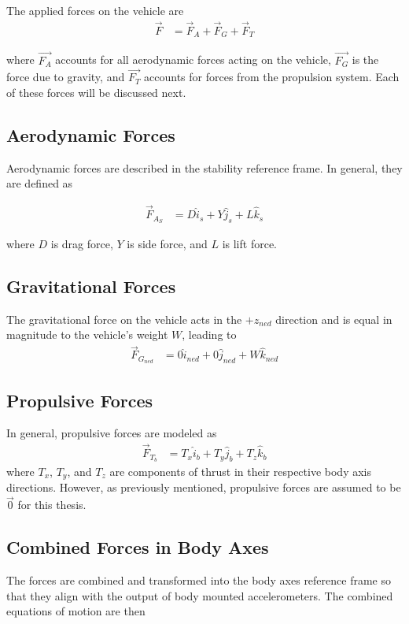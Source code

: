 \documentclass[12pt]{ucthesis}
\begin{document}
The applied forces on the vehicle are 
\begin{align}
\vec{F} &= \vec{F}_{A}+\vec{F}_{G}+\vec{F}_{T}
\end{align}

where $\vec{F_{A}}$ accounts for all aerodynamic forces acting on the vehicle, $\vec{F_{G}}$ is the force due to gravity, and $\vec{F_{T}}$ accounts for forces from the propulsion system. Each of these forces will be discussed next.

\subsection*{Aerodynamic Forces}
Aerodynamic forces are described in the stability reference frame. In general, they are defined as

\begin{align}
\vec{F}_{A_S} &= D \hat{i}_s+Y \hat{j}_s+L \hat{k}_s
\end{align}

where $D$ is drag force, $Y$ is side force, and $L$ is lift force. 

\subsection*{Gravitational Forces}
The gravitational force on the vehicle acts in the $+z_{ned}$ direction and is equal in magnitude to the vehicle's weight $W$, leading to
\begin{align}
\vec{F}_{G_{ned}} &= 0\hat{i}_{ned}+0\hat{j}_{ned}+W\hat{k}_{ned}
\end{align}

\subsection*{Propulsive Forces}
In general, propulsive forces are modeled as
\begin{align}
\vec{F}_{T_b} &= T_x \hat{i}_b+T_y \hat{j}_b +T_z \hat{k}_b
\end{align}
where $T_x$, $T_y$, and $T_z$ are components of thrust in their respective body axis directions. However, as previously mentioned, propulsive forces are assumed to be $\vec{0}$ for this thesis.

\subsection{Combined Forces in Body Axes}
The forces are combined and transformed into the body axes reference frame so that they align with the output of body mounted accelerometers. The combined equations of motion are then
\end{document}
